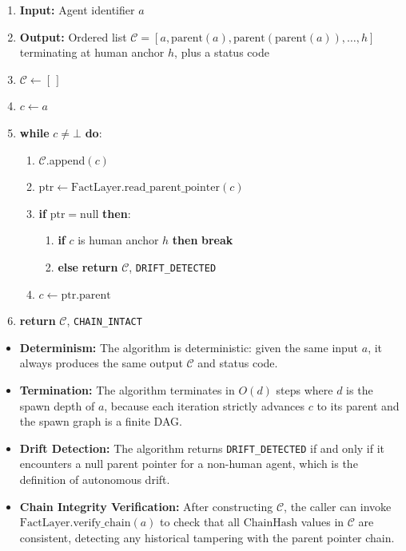 \begin{algorithm}[ht]
\caption{Chain Construction Algorithm}
\label{alg:chain}
\begin{enumerate}
  \item \textbf{Input:} Agent identifier $a$
  \item \textbf{Output:} Ordered list $\mathcal{C} = [a, \mathrm{parent}(a), \mathrm{parent}(\mathrm{parent}(a)), \ldots, h]$ terminating at human anchor $h$, plus a status code
  \item $\mathcal{C} \leftarrow [\,]$
  \item $c \leftarrow a$
  \item \textbf{while } $c \neq \bot$ \textbf{do}:
  \begin{enumerate}
    \item $\mathcal{C}$.append$(c)$
    \item $\mathrm{ptr} \leftarrow \mathrm{FactLayer.read\_parent\_pointer}(c)$
    \item \textbf{if } $\mathrm{ptr} = \text{null}$ \textbf{then}:
    \begin{enumerate}
      \item \textbf{if } $c$ is human anchor $h$ \textbf{then} \textbf{break}
      \item \textbf{else} \textbf{return} $\mathcal{C}$, \texttt{DRIFT\_DETECTED}
    \end{enumerate}
    \item $c \leftarrow \mathrm{ptr}.\mathrm{parent}$
  \end{enumerate}
  \item \textbf{return} $\mathcal{C}$, \texttt{CHAIN\_INTACT}
\end{enumerate}
\end{algorithm}

\begin{性质}
\label{prop:chain-algo}
\begin{itemize}
  \item \textbf{Determinism:} The algorithm is deterministic: given the same input $a$, it always produces the same output $\mathcal{C}$ and status code.
  \item \textbf{Termination:} The algorithm terminates in $O(d)$ steps where $d$ is the spawn depth of $a$, because each iteration strictly advances $c$ to its parent and the spawn graph is a finite DAG.
  \item \textbf{Drift Detection:} The algorithm returns \texttt{DRIFT\_DETECTED} if and only if it encounters a null parent pointer for a non-human agent, which is the definition of autonomous drift.
  \item \textbf{Chain Integrity Verification:} After constructing $\mathcal{C}$, the caller can invoke $\mathrm{FactLayer.verify\_chain}(a)$ to check that all $\mathrm{ChainHash}$ values in $\mathcal{C}$ are consistent, detecting any historical tampering with the parent pointer chain.
\end{itemize}
\end{性质}


